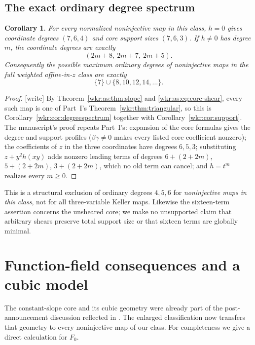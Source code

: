 \documentclass[11pt,a4paper]{article}
\numberwithin{equation}{section}
\newtheorem{corollary}[theorem]{Corollary}
\theoremstyle{definition}
\theoremstyle{remark}
\begin{document}
\subsection{The exact ordinary degree spectrum}

\begin{corollary}\label{wkr:as:cor:degrees}
For every normalized noninjective map in this class, $h=0$ gives
coordinate degrees $(7,6,4)$ and core support sizes $(7,6,3)$. If $h\ne0$
has degree $m$, the coordinate degrees are exactly
\begin{equation}\label{wkr:as:eq:degreeprofile}
(2m+8,\ 2m+7,\ 2m+5).
\end{equation}
Consequently the possible maximum ordinary degrees of noninjective maps
in the full weighted affine-in-$z$ class are exactly
\[
\{7\}\cup\{8,10,12,14,\ldots\}.
\]
\end{corollary}
\begin{proof}
\textup{[write]} By Theorem~\ref{wkr:as:thm:slope} and
\eqref{wkr:as:eq:core-shear}, every such map is one of Part~I's
Theorem~\ref{wkr:thm:triangular}, so this is
Corollary~\ref{wkr:cor:degreespectrum} together with
Corollary~\ref{wkr:cor:support}. The manuscript's proof repeats Part~I's:
expansion of the core formulas gives the degree and support profiles
($\beta\gamma\ne0$ makes every listed core coefficient nonzero); the
coefficients of $z$ in the three coordinates have degrees $6,5,3$;
substituting $z+y^2h(xy)$ adds nonzero leading terms of degrees
$6+(2+2m)$, $5+(2+2m)$, $3+(2+2m)$, which no old term can cancel; and
$h=t^m$ realizes every $m\ge0$.
\end{proof}

This is a structural exclusion of ordinary degrees $4,5,6$ for
\emph{noninjective maps in this class}, not for all three-variable Keller
maps. Likewise the sixteen-term assertion concerns the unsheared core;
we make no unsupported claim that arbitrary shears preserve total support
size or that sixteen terms are globally minimal.

\section{Function-field consequences and a cubic model}
\label{wkr:as:sec:cubic}

The constant-slope core and its cubic geometry were already part of the
post-announcement discussion reflected in \cite{shaska,gao}. The enlarged
classification now transfers that geometry to every noninjective map of
our class. For completeness we give a direct calculation for $F_0$.
\end{document}
